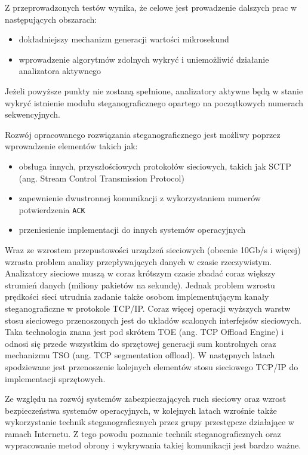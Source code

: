 \documentclass[a4paper,12pt,twoside,openany]{report}
\newcommand{\tech}{\texttt}
\begin{document}
Z przeprowadzonych testów wynika, że celowe jest prowadzenie dalszych prac w następujących obszarach:
\begin{itemize}
 \item dokładniejszy mechanizm generacji wartości mikrosekund
 \item wprowadzenie algorytmów zdolnych wykryć i uniemożliwić działanie analizatora aktywnego
\end {itemize}

Jeżeli powyższe punkty nie zostaną spełnione, analizatory aktywne będą w stanie wykryć istnienie modułu steganograficznego opartego na początkowych numerach sekwencyjnych.

Rozwój opracowanego rozwiązania steganograficznego jest możliwy poprzez wprowadzenie elementów takich jak:
\begin{itemize}
 \item obsługa innych, przyszłościowych protokołów sieciowych, takich jak SCTP (ang. Stream Control Transmission Protocol)\cite{RFC2960}
 \item zapewnienie dwustronnej komunikacji z wykorzystaniem numerów potwierdzenia \tech{ACK}
 \item przeniesienie implementacji do innych systemów operacyjnych
\end{itemize}

Wraz ze wzrostem przepustowości urządzeń sieciowych (obecnie 10Gb/s i więcej) wzrasta problem analizy przepływających danych w czasie rzeczywistym. Analizatory sieciowe muszą w coraz krótszym czasie zbadać coraz większy strumień danych (miliony pakietów na sekundę). Jednak problem wzrostu prędkości sieci utrudnia zadanie także osobom implementującym kanały steganograficzne w protokole TCP/IP. Coraz więcej operacji wyższych warstw stosu sieciowego przenoszonych jest do układów scalonych interfejsów sieciowych. Taka technologia znana jest pod skrótem TOE (ang. TCP Offload Engine) i odnosi się przede wszystkim do sprzętowej generacji sum kontrolnych oraz mechanizmu TSO (ang. TCP segmentation offload). W następnych latach spodziewane jest przenoszenie kolejnych elementów stosu sieciowego TCP/IP do implementacji sprzętowych.

Ze względu na rozwój systemów zabezpieczających ruch sieciowy oraz wzrost bezpieczeństwa systemów operacyjnych, w kolejnych latach wzrośnie także wykorzystanie technik steganograficznych przez grupy przestępcze działające w ramach Internetu. Z tego powodu poznanie technik steganograficznych oraz wypracowanie metod obrony i wykrywania takiej komunikacji jest bardzo ważne.
\end{document}
